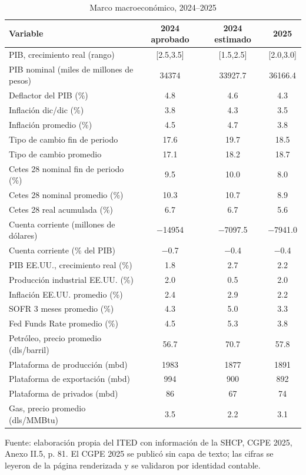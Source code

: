 \begin{table}[htbp]
\centering
\caption{Marco macroeconómico, 2024--2025}
\label{tab:C1_1}
\small
\setlength{\tabcolsep}{4pt}
\begin{tabular}{L{6.0cm}ccc}
\toprule
{Variable} & {2024 aprobado} & {2024 estimado} & {2025} \\
\midrule
{PIB, crecimiento real (rango)} & {[2.5,3.5]} & {[1.5,2.5]} & {[2.0,3.0]} \\
{PIB nominal (miles de millones de pesos)} & \num{34374} & \num{33927.7} & \num{36166.4} \\
{Deflactor del PIB (\%)} & \num{4.8} & \num{4.6} & \num{4.3} \\
{Inflación dic/dic (\%)} & \num{3.8} & \num{4.3} & \num{3.5} \\
{Inflación promedio (\%)} & \num{4.5} & \num{4.7} & \num{3.8} \\
{Tipo de cambio fin de periodo} & \num{17.6} & \num{19.7} & \num{18.5} \\
{Tipo de cambio promedio} & \num{17.1} & \num{18.2} & \num{18.7} \\
{Cetes 28 nominal fin de periodo (\%)} & \num{9.5} & \num{10.0} & \num{8.0} \\
{Cetes 28 nominal promedio (\%)} & \num{10.3} & \num{10.7} & \num{8.9} \\
{Cetes 28 real acumulada (\%)} & \num{6.7} & \num{6.7} & \num{5.6} \\
{Cuenta corriente (millones de dólares)} & \num{-14954} & \num{-7097.5} & \num{-7941.0} \\
{Cuenta corriente (\% del PIB)} & \num{-0.7} & \num{-0.4} & \num{-0.4} \\
{PIB EE.UU., crecimiento real (\%)} & \num{1.8} & \num{2.7} & \num{2.2} \\
{Producción industrial EE.UU. (\%)} & \num{2.0} & \num{0.5} & \num{2.0} \\
{Inflación EE.UU. promedio (\%)} & \num{2.4} & \num{2.9} & \num{2.2} \\
{SOFR 3 meses promedio (\%)} & \num{4.3} & \num{5.0} & \num{3.3} \\
{Fed Funds Rate promedio (\%)} & \num{4.5} & \num{5.3} & \num{3.8} \\
{Petróleo, precio promedio (dls/barril)} & \num{56.7} & \num{70.7} & \num{57.8} \\
{Plataforma de producción (mbd)} & \num{1983} & \num{1877} & \num{1891} \\
{Plataforma de exportación (mbd)} & \num{994} & \num{900} & \num{892} \\
{Plataforma de privados (mbd)} & \num{86} & \num{67} & \num{74} \\
{Gas, precio promedio (dls/MMBtu)} & \num{3.5} & \num{2.2} & \num{3.1} \\
\bottomrule
\end{tabular}
\par\vspace{2pt}\footnotesize Fuente: elaboración propia del ITED con información de la SHCP, CGPE 2025, Anexo II.5, p. 81. El CGPE 2025 se publicó sin capa de texto; las cifras se leyeron de la página renderizada y se validaron por identidad contable.
\end{table}
